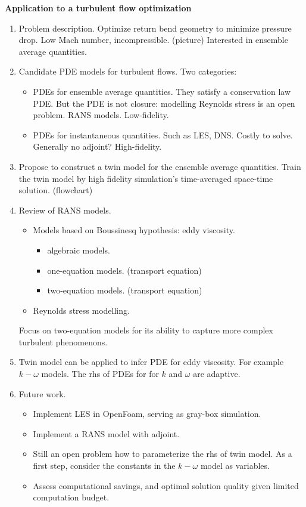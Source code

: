 \documentclass[a4paper,onecolumn]{article}
\theoremstyle{remark}
\begin{document}
\newpage
\textbf{Application to a turbulent flow optimization}
\begin{enumerate}
    \item Problem description.
          Optimize return bend geometry to minimize pressure drop. Low Mach number, incompressible.
          (picture)
          Interested in ensemble average quantities. 
    \item Candidate PDE models for turbulent flows. Two categories:
          \begin{itemize}
              \item PDEs for ensemble average quantities. They satisfy a conservation law PDE.
              But the PDE is not closure: modelling Reynolds stress is an open problem. RANS models.
              Low-fidelity.
              \item PDEs for instantaneous quantities. Such as LES, DNS. Costly to solve.
              Generally no adjoint? High-fidelity.
          \end{itemize}
    \item Propose to construct a twin model for the ensemble average quantities. Train the twin model
          by high fidelity simulation's time-averaged space-time solution.
          (flowchart)
    \item Review of RANS models.
          \begin{itemize}
              \item Models based on Boussinesq hypothesis: eddy viscosity.
                    \begin{itemize}
                        \item algebraic models.
                        \item one-equation models. (transport equation)
                        \item two-equation models. (transport equation)
                    \end{itemize}
              \item Reynolds stress modelling.
          \end{itemize}
          Focus on two-equation models for its ability to capture more complex turbulent phenomenons.
    \item Twin model can be applied to infer PDE for eddy viscosity. For example $k-\omega$ models. The rhs of PDEs for
          for $k$ and $\omega$ are adaptive.
    \item Future work.
          \begin{itemize}
              \item Implement LES in OpenFoam, serving as gray-box simulation.
              \item Implement a RANS model with adjoint.
              \item Still an open problem how to parameterize the rhs of twin model.
                    As a first step, consider the constants in the $k-\omega$ model as variables.
              \item Assess computational savings, and optimal solution quality given limited computation budget.
          \end{itemize}
\end{enumerate}
\end{document}
